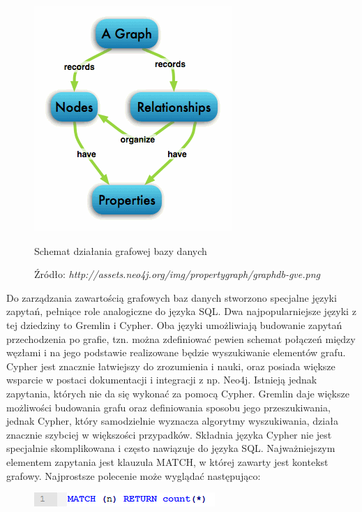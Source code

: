 \begin{figure}[H]
	\centering
	\includegraphics[scale=1]{images/graphdb.png}
	\caption{Schemat działania grafowej bazy danych}
	 \caption*{\small Źródło: \emph{http://assets.neo4j.org/img/propertygraph/graphdb-gve.png}}
	\label{fig:dbschema}
\end{figure}

Do zarządzania zawartością grafowych baz danych stworzono specjalne języki zapytań, pełniące role analogiczne do języka SQL.
Dwa najpopularniejsze języki z tej dziedziny to Gremlin i Cypher. Oba języki umożliwiają budowanie zapytań przechodzenia po grafie, tzn. można zdefiniować pewien schemat połączeń między węzłami i na jego podstawie realizowane będzie wyszukiwanie elementów grafu. Cypher jest znacznie łatwiejszy do zrozumienia i nauki, oraz posiada większe wsparcie w postaci dokumentacji i integracji z np. Neo4j. Istnieją jednak zapytania, których nie da się wykonać za pomocą Cypher. Gremlin daje większe możliwości budowania grafu oraz definiowania sposobu jego przeszukiwania, jednak Cypher, który samodzielnie wyznacza algorytmy wyszukiwania, działa znacznie szybciej w większości przypadków. Składnia języka Cypher nie jest specjalnie skomplikowana i często nawiązuje do języka SQL. Najważniejszym elementem zapytania jest klauzula MATCH, w której zawarty jest kontekst grafowy. Najprostsze polecenie może wyglądać następująco:

\begin{figure}[H]
	\centering
	\includegraphics{images/cypher_q1.png}
\end{figure}

